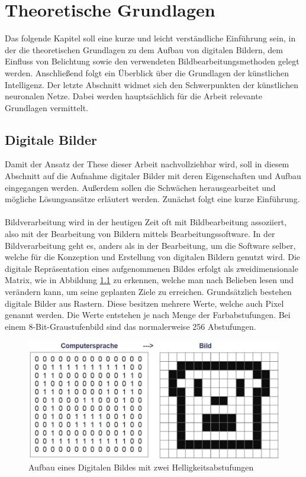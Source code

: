 \chapter{Theoretische Grundlagen}\label{s.grundlagen}
Das folgende Kapitel soll eine kurze und leicht verständliche Einführung sein, in der die theoretischen Grundlagen zu dem Aufbau von digitalen Bildern, dem Einfluss von Belichtung sowie den verwendeten Bildbearbeitungsmethoden gelegt werden. Anschließend folgt ein Überblick über die Grundlagen der künstlichen Intelligenz. Der letzte Abschnitt widmet sich den Schwerpunkten der künstlichen neuronalen Netze. Dabei werden hauptsächlich für die Arbeit relevante Grundlagen vermittelt. 
\section{Digitale Bilder}\label{s.digibilder}
Damit der Ansatz der These dieser Arbeit nachvollziehbar wird, soll in diesem Abschnitt auf die Aufnahme digitaler Bilder mit deren Eigenschaften und Aufbau eingegangen werden. Außerdem sollen die Schwächen herausgearbeitet und mögliche Lösungsansätze erläutert werden. Zunächst folgt eine kurze Einführung.\\\\
Bildverarbeitung wird in der heutigen Zeit oft mit Bildbearbeitung assoziiert, also mit der Bearbeitung von Bildern mittels Bearbeitungssoftware. In der Bildverarbeitung geht es, anders als in der Bearbeitung, um die Software selber, welche für die Konzeption und Erstellung von digitalen Bildern genutzt wird. Die digitale Repräsentation eines aufgenommenen Bildes erfolgt als zweidimensionale Matrix, wie in Abbildung \ref{img:digitalesbild} zu erkennen, welche man nach Belieben lesen und verändern kann, um seine geplanten Ziele zu erreichen. Grundsätzlich bestehen digitale Bilder aus Rastern. Diese besitzen mehrere Werte, welche auch Pixel genannt werden. Die Werte entstehen je nach Menge der Farbabstufungen. Bei einem 8-Bit-Graustufenbild sind das normalerweise 256 Abstufungen. 
\begin{figure}
[h]
\centering
\includegraphics[scale=0.5]{Sources/Digitalesbild.JPG}
\caption{Aufbau eines Digitalen Bildes mit zwei Helligkeitsabstufungen}
\label{img:digitalesbild}
\end{figure}\\

